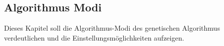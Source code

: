 \newpage
\subsection{Algorithmus Modi}
Dieses Kapitel soll die Algorithmus-Modi des genetischen Algorithmus verdeutlichen und die Einstellungsmöglichkeiten aufzeigen.

%	


